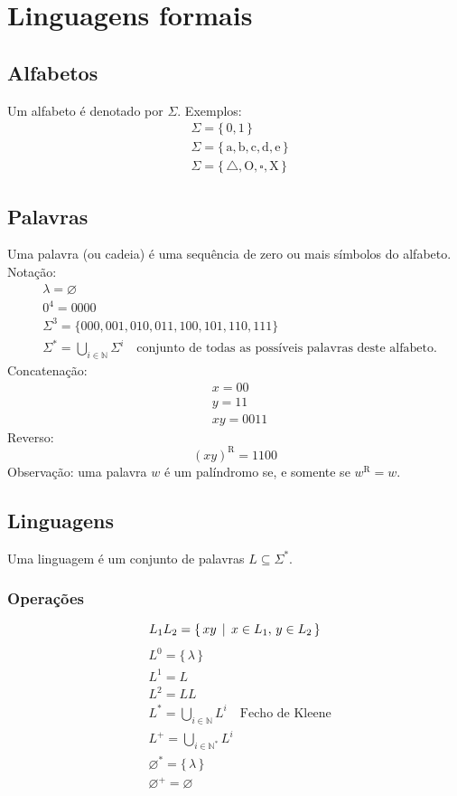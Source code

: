 \documentclass[11pt]{article}
\date{\today}
\title{}
\begin{document}
\section{Linguagens formais}
\label{sec:orgedcbd98}
\subsection{Alfabetos}
\label{sec:orgb87a6a2}
Um alfabeto é denotado por \(\Sigma\). Exemplos:
\begin{align*}
  & \Sigma = \{\, 0, 1 \,\} \\
  & \Sigma = \{\, \text{a}, \text{b}, \text{c}, \text{d}, \text{e} \,\} \\
  & \Sigma = \{\, \triangle, \text{O}, \square, \text{X} \,\}
\end{align*}
\subsection{Palavras}
\label{sec:orgc518943}
Uma palavra (ou cadeia) é uma sequência de zero ou mais símbolos do alfabeto.
\\[5pt]
Notação:
\begin{align*}
  & \lambda = \varnothing \\
  & 0^4 = 0000 \\
  & \Sigma^3 = \{ 000, 001, 010, 011, 100, 101, 110, 111 \} \\
  & \Sigma^* = \bigcup_{i \in \mathbb{N}} \Sigma^i \quad \text{conjunto de todas as possíveis palavras deste alfabeto.}
\end{align*}
Concatenação:
\begin{align*}
  & x = 00 \\
  & y = 11 \\
  & xy = 0011
\end{align*}
Reverso:
\[
  (xy)^{\text{R}} = 1100
\]
Observação: uma palavra \(w\) é um palíndromo se, e somente se \(w^{\text{R}} = w\).
\subsection{Linguagens}
\label{sec:org1def875}
Uma linguagem é um conjunto de palavras \(L \subseteq \Sigma^*\).
\subsubsection{Operações}
\label{sec:org0193a2f}
\[ L_1L_2 = \{\, xy \,\mid\, x \in L_1,\, y \in L_2 \,\} \\ \]
\begin{align*}
  & L^0 = \{\, \lambda \,\} \\
  & L^1 = L \\
  & L^2 = LL \\
  & L^* = \bigcup_{i \in \mathbb{N}} L^i \quad \text{Fecho de Kleene} \\
  & L^+ = \bigcup_{i \in \mathbb{N}^*} L^i \\
  & \varnothing^* = \{\, \lambda \,\} \\
  & \varnothing^+ = \varnothing
\end{align*}
\end{document}
